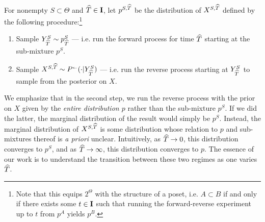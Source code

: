 \begin{definition}\label{sec:noisedenoise} For nonempty $S \subset \Theta$ and $\widehat{T} \in \mathbf{I}$, let $p^{S,\widehat{T}}$ be the distribution of $X^{S,\widehat{T}}$ defined by the following procedure:\footnote{Note that this equips $2^{\Theta}$ with the structure of a poset, i.e. $A \subset B$ if and only if there exists some $t \in \mathbf{I}$ such that running the forward-reverse experiment up to 
$t$ from $p^A$ yields $p^B$.}
\begin{enumerate}[leftmargin=*,topsep=0pt,itemsep=0pt]
    \item Sample $Y_{\widehat{T}}^S \sim p_{\widehat{T}}^S$ \---- i.e. run the forward process for time $\widehat{T}$ starting at the sub-mixture $p^S$.
    \item Sample $X^{S,\wh{T}} \sim \kernelreverse[]_{}(\cdot | Y_{\wh{T}}^S)$ \---- i.e. run the reverse process starting at $Y^S_{\widehat{T}}$ to sample from the posterior on $X$.
\end{enumerate}
\end{definition}

We emphasize that in the second step, we run the reverse process with the prior on $X$ given by the \emph{entire distribution $p$} rather than the sub-mixture $p^S$. If we did the latter, the marginal distribution of the result would simply be $p^S$. Instead, the marginal distribution of $X^{S,\widehat{T}}$ is some distribution whose relation to $p$ and sub-mixtures thereof is \emph{a priori} unclear. Intuitively, as $\widehat{T} \to 0$, this distribution converges to $p^S$, and as $\widehat{T}\to\infty$, this distribution converges to $p$. The essence of our work is to understand the transition between these two regimes as one varies $\widehat{T}$. 
